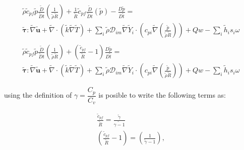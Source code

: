 \documentclass[preprint,12pt,authoryear]{elsarticle}
\begin{document}
\begin{equation}
\begin{split}
        \tilde{\rho}
        \tilde{c}_{pf}
        \tilde{p} 
        \frac{\tilde{D}}{\tilde{D} t}
        \left(
                \frac{1}{\tilde{\rho}\tilde{R}}
        \right)
	+
        \frac{1}{\tilde{R}}
        \tilde{c}_{pf}
        \frac{\tilde{D}}{\tilde{D} t}
        \left(
                \tilde{p}
        \right)
        -
        \frac{D \tilde{p}}{D\tilde{t}}
        =
\\
        \pmb{\tilde{\tau}}:\tilde{\nabla} \tilde{\mathbf{u}} 
        + 
        \tilde{\nabla} \cdot (\tilde{k}\tilde{\nabla} \tilde{T})
        +
        \sum\limits_i 
        \tilde{\rho}
        \mathcal{D}_{im}
        \tilde{\nabla}
        \tilde{Y}_i     
        \cdot
        \left(
                c_{pi}
                \tilde{\nabla}
                \left(
                	\frac{\tilde{p}}{\tilde{\rho}\tilde{R}}
                \right)
        \right)
	+
	Qw
	-
        \sum\limits_i
	\tilde{h}_i
        s_i \omega	
\\
\\
        \tilde{\rho}
        \tilde{c}_{pf}
        \tilde{p}
        \frac{\tilde{D}}{\tilde{D} t}
        \left(
                \frac{1}{\tilde{\rho}\tilde{R}}
        \right)
	+
        \left(
        	\frac{\tilde{c}_{pf}}{\tilde{R}}
		-1
        \right)
        \frac{D \tilde{p}}{D\tilde{t}}
        =
	\\
        \pmb{\tilde{\tau}}:\tilde{\nabla} \tilde{\mathbf{u}} 
        + 
        \tilde{\nabla} \cdot (\tilde{k}\tilde{\nabla} \tilde{T})
        +
        \sum\limits_i 
        \tilde{\rho}
        \mathcal{D}_{im}
        \tilde{\nabla}
        \tilde{Y}_i     
        \cdot
        \left(
                c_{pi}
                \tilde{\nabla}
                \left(
                	\frac{\tilde{p}}{\tilde{\rho}\tilde{R}}
                \right)
        \right)
	+
	Qw
	-
        \sum\limits_i
	\tilde{h}_i
        s_i \omega	
\end{split}
\end{equation}

using the definition of $\gamma=\dfrac{C_p}{C_v}$ is 
posible to write the  following terms as:

\begin{equation}
\begin{split}
	\frac{\tilde{c}_{pf}}{\tilde{R}}=\frac{\tilde{\gamma}}{\tilde{\gamma-1}}
	\\
        \left(
        	\frac{\tilde{c}_{pf}}{\tilde{R}}
		-1
        \right)
	=
        \left(
		\frac{1}{\tilde{\gamma}-1}
        \right),
	\label{cp}
\end{split}
\end{equation}
\end{document}
